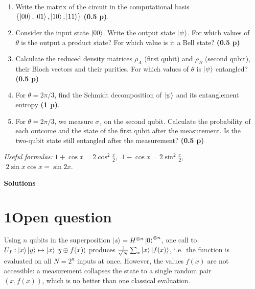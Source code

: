 \documentclass[11pt,a4paper]{article}
\newcommand{\pts}[1]{\textbf{(#1)}}
\newcommand{\sol}{\color{blue!60!black}}
\begin{document}
\begin{enumerate}
\item Write the matrix of the circuit in the computational basis $\{\ket{00},\ket{01},\ket{10},\ket{11}\}$ \pts{0.5 p}.
\item Consider the input state $\ket{00}$. Write the output state $\ket{\psi}$. For which values of
$\theta$ is the output a product state? For which value is it a Bell state? \pts{0.5 p}
\item Calculate the reduced density matrices $\rho_A$ (first qubit) and $\rho_B$ (second qubit),
their Bloch vectors and their purities. For which values of $\theta$ is $\ket{\psi}$ entangled?
\pts{0.5 p}
\item For $\theta=2\pi/3$, find the Schmidt decomposition of $\ket{\psi}$ and its entanglement
entropy \pts{1 p}.
\item For $\theta=2\pi/3$, we measure $\sigma_z$ on the second qubit. Calculate the probability of
each outcome and the state of the first qubit after the measurement. Is the two-qubit state still
entangled after the measurement? \pts{0.5 p}
\end{enumerate}

\textit{Useful formulas:} $1+\cos x = 2\cos^2\frac{x}{2}$, $\;1-\cos x = 2\sin^2\frac{x}{2}$, $\;2\sin x\cos x=\sin 2x$.

\newpage
\begin{center}
\Large\textbf{Solutions}
\end{center}
\sol

\section*{1\quad Open question}

Using $n$ qubits in the superposition $\ket{s}=H^{\otimes n}\ket{0}^{\otimes n}$, one call to
$U_f:\ket{x}\ket{y}\mapsto\ket{x}\ket{y\oplus f(x)}$ produces
$\frac{1}{\sqrt N}\sum_x\ket{x}\ket{f(x)}$, i.e.\ the function is evaluated on all
$N=2^n$ inputs at once. However, the values $f(x)$ are not accessible: a measurement collapses the
state to a single random pair $(x,f(x))$, which is no better than one classical evaluation.
\end{document}
